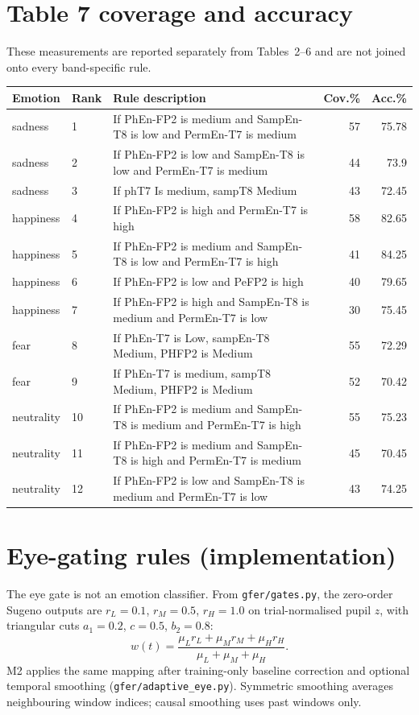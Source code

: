 \section{Table 7 coverage and accuracy}
These measurements are reported separately from Tables~2--6 and are not joined onto every band-specific rule.
\par\smallskip
{\tiny
\setlength{\tabcolsep}{2pt}
\begin{tabularx}{\linewidth}{@{}llXrr@{}}
\toprule Emotion & Rank & Rule description & Cov.\% & Acc.\% \\
\midrule
sadness & 1 & If PhEn-FP2 is medium and SampEn-T8 is low and PermEn-T7 is medium & 57 & 75.78 \\
sadness & 2 & If PhEn-FP2 is low and SampEn-T8 is low and PermEn-T7 is medium & 44 & 73.9 \\
sadness & 3 & If phT7 Is medium, sampT8 Medium & 43 & 72.45 \\
happiness & 4 & If PhEn-FP2 is high and PermEn-T7 is high & 58 & 82.65 \\
happiness & 5 & If PhEn-FP2 is medium and SampEn-T8 is low and PermEn-T7 is high & 41 & 84.25 \\
happiness & 6 & If PhEn-FP2 is low and PeFP2 is high & 40 & 79.65 \\
happiness & 7 & If PhEn-FP2 is high and SampEn-T8 is medium and PermEn-T7 is low & 30 & 75.45 \\
fear & 8 & If PhEn-T7 is Low, sampEn-T8 Medium, PHFP2 is Medium & 55 & 72.29 \\
fear & 9 & If PhEn-T7 is medium, sampT8 Medium, PHFP2 is Medium & 52 & 70.42 \\
neutrality & 10 & If PhEn-FP2 is medium and SampEn-T8 is medium and PermEn-T7 is high & 55 & 75.23 \\
neutrality & 11 & If PhEn-FP2 is medium and SampEn-T8 is high and PermEn-T7 is medium & 45 & 70.45 \\
neutrality & 12 & If PhEn-FP2 is low and SampEn-T8 is medium and PermEn-T7 is low & 43 & 74.25 \\
\bottomrule
\end{tabularx}
}
\par\smallskip

\section{Eye-gating rules (implementation)}
The eye gate is not an emotion classifier. From \texttt{gfer/gates.py}, the zero-order Sugeno outputs are $r_L=0.1$, $r_M=0.5$, $r_H=1.0$ on trial-normalised pupil $z$, with triangular cuts $a_1=0.2$, $c=0.5$, $b_2=0.8$:
\begin{equation}
w(t)=\frac{\mu_L r_L+\mu_M r_M+\mu_H r_H}{\mu_L+\mu_M+\mu_H}.
\end{equation}
M2 applies the same mapping after training-only baseline correction and optional temporal smoothing (\texttt{gfer/adaptive\_eye.py}). Symmetric smoothing averages neighbouring window indices; causal smoothing uses past windows only.

